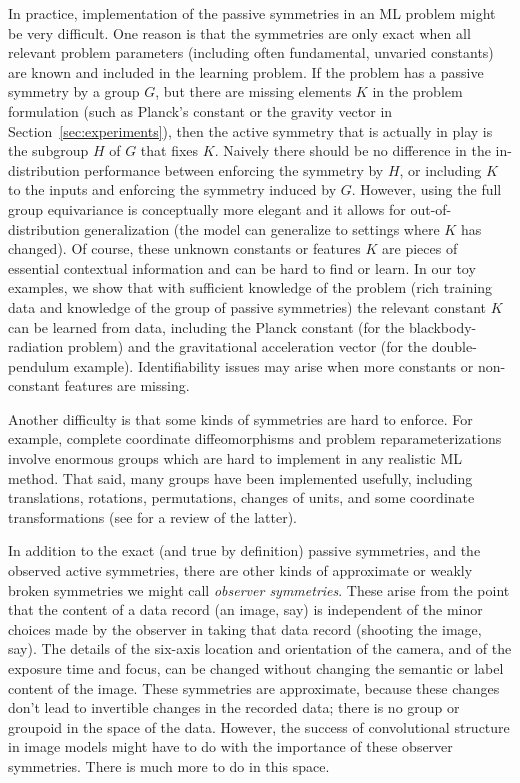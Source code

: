 \documentclass[]{article} %
\newcommand{\sectionname}{Section}
\newcommand{\secref}[1]{\sectionname~\ref{#1}}
\begin{document}
In practice, implementation of the passive symmetries in an ML problem might be very difficult.
One reason is that the symmetries are only exact when all relevant problem parameters (including often fundamental, unvaried constants) are known and included in the learning problem.
If the problem has a passive symmetry by a group $G$, but there are missing elements $K$ in the problem formulation (such as Planck's constant or the gravity vector in \secref{sec:experiments}), then the active symmetry that is actually in play is the subgroup $H$ of $G$ that fixes $K$. 
Naively there should be no difference in the in-distribution performance between enforcing the symmetry by $H$, or including $K$ to the inputs and enforcing the symmetry induced by $G$. 
However, using the full group equivariance is conceptually more elegant and it allows for out-of-distribution generalization (the model can generalize to settings where  $K$ has changed).
Of course, these unknown constants or features $K$ are pieces of essential contextual information and can be hard to find or learn. 
In our toy examples, we show that with sufficient knowledge of the problem (rich training data and knowledge of the group of passive symmetries) the relevant constant $K$ can be learned from data, including the Planck constant (for the blackbody-radiation problem) and the gravitational acceleration vector (for the double-pendulum example).
Identifiability issues may arise when more constants or non-constant features are missing.

Another difficulty is that some kinds of symmetries are hard to enforce.
For example, complete coordinate diffeomorphisms and problem reparameterizations involve enormous groups which are hard to implement in any realistic ML method.
That said, many groups have been implemented usefully, including translations, rotations, permutations, changes of units, and some coordinate transformations (see \citealt{weiler} for a review of the latter). 

In addition to the exact (and true by definition) passive symmetries, and the observed active symmetries, there are other kinds of approximate or weakly broken symmetries we might call \emph{observer symmetries}.
These arise from the point that the content of a data record (an image, say) is independent of the minor choices made by the observer in taking that data record (shooting the image, say).
The details of the six-axis location and orientation of the camera, and of the exposure time and focus, can be changed without changing the semantic or label content of the image.
These symmetries are approximate, because these changes don't lead to invertible changes in the recorded data; there is no group or groupoid in the space of the data.
However, the success of convolutional structure in image models might have to do with the importance of these observer symmetries.
There is much more to do in this space.
\end{document}
